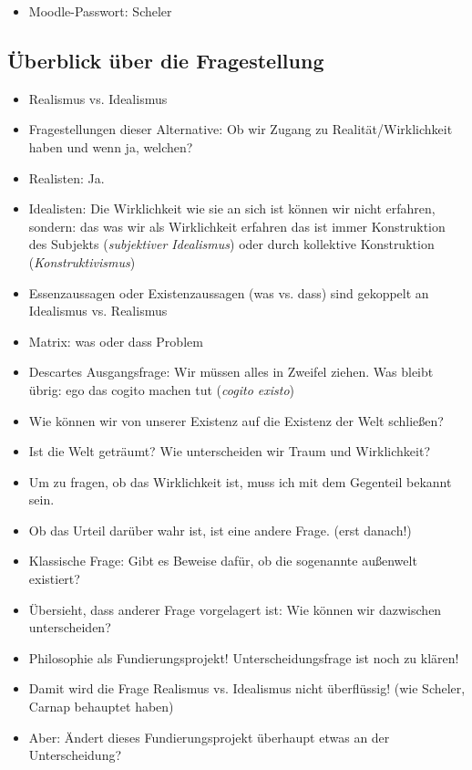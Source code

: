 \documentclass[emulatestandardclasses]{scrartcl}
\begin{document}
\begin{itemize}
  \item Moodle-Passwort: Scheler
\end{itemize}


\subsection{Überblick über die Fragestellung}

\begin{itemize}
  \item Realismus vs. Idealismus
  \item Fragestellungen dieser Alternative: Ob wir Zugang zu Realität/Wirklichkeit haben und wenn ja, welchen?
  \item Realisten: Ja.
  \item Idealisten: Die Wirklichkeit wie sie an sich ist können wir nicht erfahren, sondern: das was wir als Wirklichkeit erfahren das ist immer Konstruktion des Subjekts (\emph{subjektiver Idealismus}) oder durch kollektive Konstruktion (\emph{Konstruktivismus})
  \item Essenzaussagen oder Existenzaussagen (was vs. dass) sind gekoppelt an Idealismus vs. Realismus
  \item Matrix: was oder dass Problem
  \item Descartes Ausgangsfrage: Wir müssen alles in Zweifel ziehen. Was bleibt übrig: ego das cogito machen tut (\emph{cogito existo})
  \item Wie können wir von unserer Existenz auf die Existenz der Welt schließen?
  \item Ist die Welt geträumt? Wie unterscheiden wir Traum und Wirklichkeit?
  \item Um zu fragen, ob das Wirklichkeit ist, muss ich mit dem Gegenteil bekannt sein.
  \item Ob das Urteil darüber wahr ist, ist eine andere Frage. (erst danach!)
  \item Klassische Frage: Gibt es Beweise dafür, ob die sogenannte außenwelt existiert?
  \item Übersieht, dass anderer Frage vorgelagert ist: Wie können wir dazwischen unterscheiden?
  \item Philosophie als Fundierungsprojekt! Unterscheidungsfrage ist noch zu klären!
  \item Damit wird die Frage Realismus vs. Idealismus nicht überflüssig! (wie Scheler, Carnap behauptet haben)
  \item Aber: Ändert dieses Fundierungsprojekt überhaupt etwas an der Unterscheidung?

\end{itemize}
\end{document}
